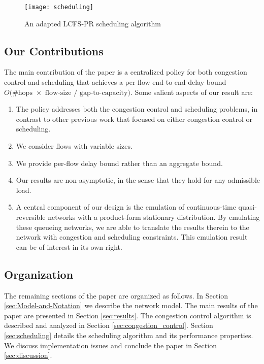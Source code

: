 \documentclass[ssy,preprint]{imsart_axv}
\numberwithin{equation}{section}
\theoremstyle{plain}
\theoremstyle{definition}
\theoremstyle{remark}
\theoremstyle{plain}
\theoremstyle{plain}
\begin{document}
\begin{figure}
	\begin{centering}
		\texttt{[image: scheduling]}
		\par\end{centering}
	\caption{An adapted LCFS-PR scheduling algorithm \label{fig:scheduling}}
\end{figure}


\subsection{Our Contributions}

The main contribution of the paper is a centralized policy for both congestion control
and scheduling that achieves a per-flow end-to-end delay bound $\ensuremath{O}(\#\text{hops }\ensuremath{\times}$
$\text{flow-size }\ensuremath{/}\text{ gap-to-capacity})$. Some
salient aspects of our result are:
\begin{enumerate}
	\item The policy addresses both the congestion control and scheduling problems,
	in contrast to other previous work that focused on either congestion
	control or scheduling. 
	\item We consider flows with variable sizes.
	\item We provide per-flow delay bound rather than an aggregate bound. 
	\item Our results are non-asymptotic, in the sense that they hold for any admissible load.
	\item A central component of our design is the emulation of continuous-time
	quasi-reversible networks with a product-form stationary distribution.
	By emulating these queueing networks, we are able to translate the
	results therein to the network with congestion and scheduling constraints. 
	This emulation result can be of interest in its own right.
\end{enumerate}

\subsection{Organization}The remaining sections of the paper are organized
as follows. In Section \ref{sec:Model-and-Notation} we describe the
network model. The main results of the paper are presented in Section
\ref{sec:results}. The congestion control algorithm is described
and analyzed in Section \ref{sec:congestion_control}. Section \ref{sec:scheduling}
details the scheduling algorithm and its performance properties. We
discuss implementation issues and conclude the paper in Section \ref{sec:discussion}.














 
\end{document}
